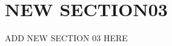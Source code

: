 \documentclass[../main.tex]{subfiles}
\begin{document}
\section{NEW SECTION03}
\label{sec:new_section_03}
ADD NEW SECTION 03 HERE \cite{Loporchio2023}
\end{document}
